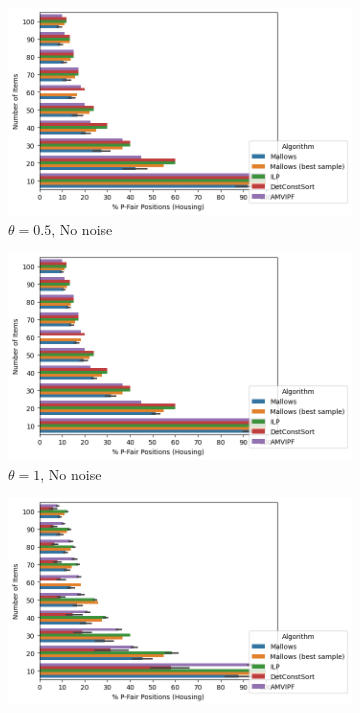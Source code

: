 \begin{figure}
     \centering
     \begin{subfigure}[b]{0.4\textwidth}
         \centering
         \includegraphics[width=\textwidth]{resources/00/p_pfair_hou.png}
         \caption{$\theta = 0.5$, No noise}
         \label{fig:00pfair}
     \end{subfigure}\quad
     \begin{subfigure}[b]{0.4\textwidth}
         \centering
         \includegraphics[width=\textwidth]{resources/10/p_pfair_hou.png}
         \caption{$\theta = 1$, No noise}
         \label{fig:10pfair}
     \end{subfigure}\quad
     \begin{subfigure}[b]{0.4\textwidth}
         \centering
         \includegraphics[width=\textwidth]{resources/01/p_pfair_hou.png}

\end{subfigure}
\end{figure}

